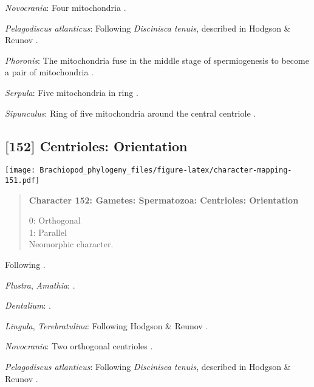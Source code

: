 \documentclass[openany]{book}
\theoremstyle{definition}
\theoremstyle{definition}
\theoremstyle{definition}
\theoremstyle{remark}
\begin{document}
\hypertarget{Novocrania-coding-151}{}
\emph{Novocrania}: Four mitochondria \citep{Afzelius1978Finestructure}.

\hypertarget{Pelagodiscus_atlanticus-coding-151}{}
\emph{Pelagodiscus atlanticus}: Following \emph{Discinisca}
\emph{tenuis}, described in Hodgson \& Reunov
\citeyearpar{Hodgson1994Ultrastructureof}.

\hypertarget{Phoronis-coding-151}{}
\emph{Phoronis}: The mitochondria fuse in the middle stage of
spermiogenesis to become a pair of mitochondria
\citep{Reunov2004Ultrastructuralstudy}.

\hypertarget{Serpula-coding-151}{}
\emph{Serpula}: Five mitochondria in ring \citep{Gherardi2011}.

\hypertarget{Sipunculus-coding-151}{}
\emph{Sipunculus}: Ring of five mitochondria around the central
centriole \citep{Rice1993}.

\subsection*{{[}152{]} Centrioles:
Orientation}\label{centrioles-orientation}

\texttt{[image: Brachiopod\_phylogeny\_files/figure-latex/character-mapping-151.pdf]}

\begin{quote}
\textbf{Character 152: Gametes: Spermatozoa: Centrioles: Orientation}

0: Orthogonal\\
1: Parallel\\
Neomorphic character.
\end{quote}

Following \citet{Hodgson1994Ultrastructureof}.

\hypertarget{Amathia-coding-152}{}
\emph{Flustra}, \emph{Amathia}: \citep{Franzen1981}.

\hypertarget{Dentalium-coding-152}{}
\emph{Dentalium}: \citet{DufresneDube1983}.

\hypertarget{Lingula-coding-152}{}
\emph{Lingula}, \emph{Terebratulina}: Following Hodgson \& Reunov
\citeyearpar{Hodgson1994Ultrastructureof}.

\hypertarget{Novocrania-coding-152}{}
\emph{Novocrania}: Two orthogonal centrioles
\citep{Afzelius1978Finestructure}.

\hypertarget{Pelagodiscus_atlanticus-coding-152}{}
\emph{Pelagodiscus atlanticus}: Following \emph{Discinisca}
\emph{tenuis}, described in Hodgson \& Reunov
\citeyearpar{Hodgson1994Ultrastructureof}.
\end{document}
